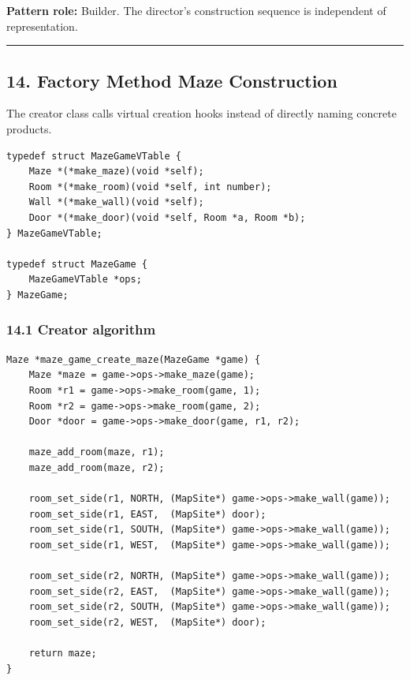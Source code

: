 \documentclass[11pt]{article}
\begin{document}
\textbf{Pattern role:} Builder. The director's construction sequence is independent of representation.

\begin{center}\rule{0.5\linewidth}{0.5pt}\end{center}

\subsection{14. Factory Method Maze Construction}\label{factory-method-maze-construction}

The creator class calls virtual creation hooks instead of directly naming concrete products.

\begin{verbatim}
typedef struct MazeGameVTable {
    Maze *(*make_maze)(void *self);
    Room *(*make_room)(void *self, int number);
    Wall *(*make_wall)(void *self);
    Door *(*make_door)(void *self, Room *a, Room *b);
} MazeGameVTable;

typedef struct MazeGame {
    MazeGameVTable *ops;
} MazeGame;
\end{verbatim}

\subsubsection{14.1 Creator algorithm}\label{creator-algorithm}

\begin{verbatim}
Maze *maze_game_create_maze(MazeGame *game) {
    Maze *maze = game->ops->make_maze(game);
    Room *r1 = game->ops->make_room(game, 1);
    Room *r2 = game->ops->make_room(game, 2);
    Door *door = game->ops->make_door(game, r1, r2);

    maze_add_room(maze, r1);
    maze_add_room(maze, r2);

    room_set_side(r1, NORTH, (MapSite*) game->ops->make_wall(game));
    room_set_side(r1, EAST,  (MapSite*) door);
    room_set_side(r1, SOUTH, (MapSite*) game->ops->make_wall(game));
    room_set_side(r1, WEST,  (MapSite*) game->ops->make_wall(game));

    room_set_side(r2, NORTH, (MapSite*) game->ops->make_wall(game));
    room_set_side(r2, EAST,  (MapSite*) game->ops->make_wall(game));
    room_set_side(r2, SOUTH, (MapSite*) game->ops->make_wall(game));
    room_set_side(r2, WEST,  (MapSite*) door);

    return maze;
}
\end{verbatim}
\end{document}
